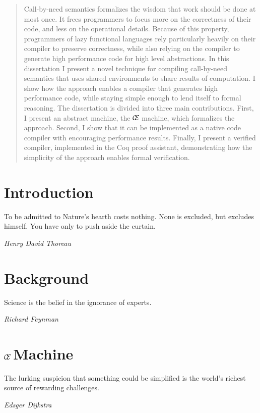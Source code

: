 \documentclass[botnum]{unmeethesis}
\def\ce{$\mathcal{\mathcal{C} \mskip -4mu \mathcal{E}} \mskip 4mu$}
\begin{document}
\begin{abstract}
Call-by-need semantics formalizes the wisdom that work should be done at most
once. It frees programmers to focus more on the correctness of their code, and
less on the operational details. Because of this property, programmers of lazy
functional languages rely particularly heavily on their compiler to preserve
correctness, while also relying on the compiler to generate high performance
code for high level abstractions. In this dissertation I present a novel
technique for compiling call-by-need semantics that uses shared environments to
share results of computation. I show how the approach enables a compiler that
generates high performance code, while staying simple enough to lend itself to
formal reasoning. The dissertation is divided into three main contributions.
First, I present an abstract machine, the \ce machine, which formalizes the
approach.  Second, I show that it can be implemented as a native code compiler
with encouraging performance results.  Finally, I present a verified compiler,
implemented in the Coq proof assistant, demonstrating how the simplicity of
the approach enables formal verification.
\clearpage %
\end{abstract}

\tableofcontents
\listoffigures

\mainmatter

\chapter{Introduction}\label{chap:intro}
\epigraph{To be admitted to Nature's hearth costs nothing. None is excluded, but
excludes himself. You have only to push aside the curtain.}{\textit{Henry David
Thoreau}}


\chapter{Background}\label{chap:background}
\epigraph{Science is the belief in the ignorance of experts.}{\textit{Richard
Feynman}}


\chapter{\ce Machine}\label{chap:ce}
\epigraph{The lurking suspicion that something could be simplified is the
world's richest source of rewarding challenges.}{\textit{Edsger Dijkstra}}



\end{document}
